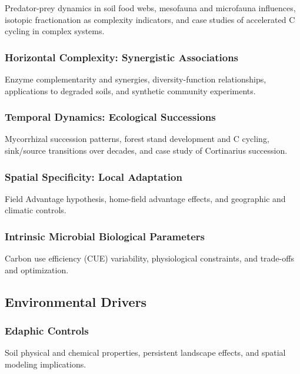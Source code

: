 \documentclass[12pt,a4paper]{article}
\begin{document}
Predator-prey dynamics in soil food webs, mesofauna and microfauna influences, isotopic fractionation as complexity indicators, and case studies of accelerated C cycling in complex systems.


\subsubsection{Horizontal Complexity: Synergistic Associations} \label{sec:microbial_horizontal}

Enzyme complementarity and synergies, diversity-function relationships, applications to degraded soils, and synthetic community experiments.


\subsubsection{Temporal Dynamics: Ecological Successions} \label{sec:microbial_succession}

Mycorrhizal succession patterns, forest stand development and C cycling, sink/source transitions over decades, and case study of Cortinarius succession.


\subsubsection{Spatial Specificity: Local Adaptation} \label{sec:microbial_specificity}

Field Advantage hypothesis, home-field advantage effects, and geographic and climatic controls.


\subsubsection{Intrinsic Microbial Biological Parameters} \label{sec:microbial_intrinsic}

Carbon use efficiency (CUE) variability, physiological constraints, and trade-offs and optimization.


\subsection{Environmental Drivers} \label{sec:microbial_environment}

\subsubsection{Edaphic Controls} \label{sec:microbial_edaphic}

Soil physical and chemical properties, persistent landscape effects, and spatial modeling implications.
\end{document}
